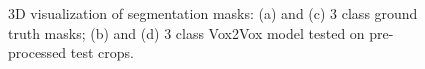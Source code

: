 \begin{figure}[!htb]
\centering
{}\hfil
{}

\hfil 
{}

\caption{3D visualization of segmentation masks: (a) and (c) 3 class ground truth masks; (b) and (d) 3 class Vox2Vox model tested on pre-processed test crops.}

\label{fig:results-vox2vox-3channel}

\end{figure}

